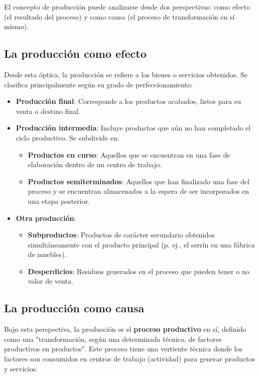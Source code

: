 El concepto de producción puede analizarse desde dos perspectivas: como efecto (el resultado del proceso) y como causa (el proceso de transformación en sí mismo).

\subsection{La producción como efecto}
Desde esta óptica, la producción se refiere a los bienes o servicios obtenidos. Se clasifica principalmente según su grado de perfeccionamiento:
\begin{itemize}
    \item \textbf{Producción final}: Corresponde a los productos acabados, listos para su venta o destino final.
    \item \textbf{Producción intermedia}: Incluye productos que aún no han completado el ciclo productivo. Se subdivide en:
        \begin{itemize}
            \item \textbf{Productos en curso}: Aquellos que se encuentran en una fase de elaboración dentro de un centro de trabajo.
            \item \textbf{Productos semiterminados}: Aquellos que han finalizado una fase del proceso y se encuentran almacenados a la espera de ser incorporados en una etapa posterior.
        \end{itemize}
    \item \textbf{Otra producción}:
        \begin{itemize}
            \item \textbf{Subproductos}: Productos de carácter secundario obtenidos simultáneamente con el producto principal (p. ej., el serrín en una fábrica de muebles).
            \item \textbf{Desperdicios}: Residuos generados en el proceso que pueden tener o no valor de venta.
        \end{itemize}
\end{itemize}

\subsection{La producción como causa}
Bajo esta perspectiva, la producción es el \textbf{proceso productivo} en sí, definido como una "transformación, según una determinada técnica, de factores productivos en productos". Este proceso tiene una vertiente técnica donde los factores son consumidos en centros de trabajo (actividad) para generar productos y servicios.

